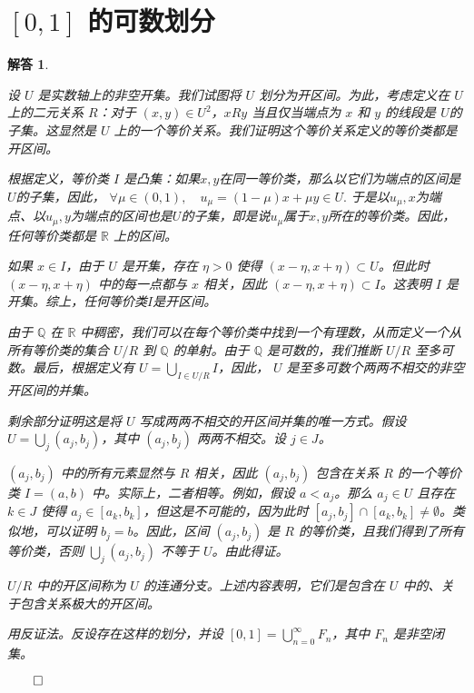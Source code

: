 \documentclass[12pt,UTF8]{ctexbook}
\theoremstyle{exercisestyle}
\theoremstyle{solutionstyle}
\newtheorem*{solution*}{解答}
\newenvironment{solution}
  {\begin{solution*}}
  {\hfill\ensuremath{\qed}\end{solution*}}
\begin{document}
\section{$[0,1]$ 的可数划分}
\begin{solution}
  \begin{subquestions}
    \item 设 \( U \) 是实数轴上的非空开集。我们试图将 \( U \) 划分为开区间。为此，考虑定义在 \( U \) 上的二元关系 \( R \)：对于 \((x, y) \in U^2\)，\( x R y \) 当且仅当端点为 \( x \) 和 \( y \) 的线段是 \( U \)的子集。这显然是 \( U \) 上的一个等价关系。我们证明这个等价关系定义的等价类都是开区间。
    
    根据定义，等价类 \( I \) 是凸集：如果$x, y$在同一等价类，那么以它们为端点的区间是$U$的子集，因此，
    $\forall \mu\in(0,1), \quad u_{\mu}  = (1 - \mu)x + \mu y \in U. $
    于是以$u_{\mu},x$为端点、以$u_{\mu},y$为端点的区间也是$U$的子集，即是说$u_{\mu}$属于$x,y$所在的等价类。因此，任何等价类都是 \( \mathbb{R} \) 上的区间。
    
    如果 \( x \in I \)，由于 \( U \) 是开集，存在 \( \eta > 0 \) 使得 \((x - \eta, x + \eta) \subset U\)。但此时 \((x - \eta, x + \eta)\) 中的每一点都与 \( x \) 相关，因此 \((x - \eta, x + \eta) \subset I\)。这表明 \( I \) 是开集。综上，任何等价类$I$是开区间。
    
    由于 \( \mathbb{Q} \) 在 \( \mathbb{R} \) 中稠密，我们可以在每个等价类中找到一个有理数，从而定义一个从所有等价类的集合 \( U/R \) 到 \( \mathbb{Q} \) 的单射。由于 \( \mathbb{Q} \) 是可数的，我们推断 \( U/R \) 至多可数。最后，根据定义有 \( U = \bigcup_{I \in U/R} I \)，因此， \( U \) 是至多可数个两两不相交的非空开区间的并集。

    剩余部分证明这是将 \( U \) 写成两两不相交的开区间并集的唯一方式。假设 \( U = \bigcup_j (a_j, b_j) \)，其中 \((a_j, b_j)\) 两两不相交。设 \( j \in J \)。

    \((a_j, b_j)\) 中的所有元素显然与 \( R \) 相关，因此 \((a_j, b_j)\) 包含在关系 \( R \) 的一个等价类 \( I = (a, b) \) 中。实际上，二者相等。例如，假设 \( a < a_j \)。那么 \( a_j \in U \) 且存在 \( k \in J \) 使得 \( a_j \in [a_k, b_k] \)，但这是不可能的，因为此时 \([a_j, b_j] \cap [a_k, b_k] \neq \emptyset\)。类似地，可以证明 \( b_j = b \)。因此，区间 \((a_j, b_j)\) 是 \( R \) 的等价类，且我们得到了所有等价类，否则 \(\bigcup_j (a_j, b_j)\) 不等于 \( U \)。由此得证。

    \( U/R \) 中的开区间称为 \( U \) 的连通分支。上述内容表明，它们是包含在 \( U \) 中的、关于包含关系极大的开区间。
    \item 用反证法。反设存在这样的划分，并设 \([0,1] = \bigcup_{n=0}^{\infty} F_n\)，其中 \( F_n \) 是非空闭集。


\end{subquestions}
\end{solution}
\end{document}
